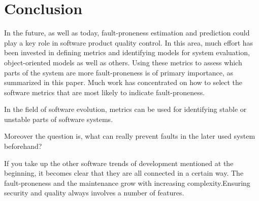 \section{Conclusion}\label{conclusion}

In the future, as well as today, fault-proneness estimation and prediction could play a key role in software product quality control.  In this area, much effort has been invested in defining metrics and identifying models for system evaluation, object-oriented models as well as others.  Using these metrics to assess which parts of the system are more fault-proneness is of primary importance, as summarized in this paper.
Much work has concentrated on how to select the software metrics that are most likely to indicate fault-proneness. 

In the field of software evolution, metrics can be used for identifying stable or unstable parts of software systems.

Moreover the question is, what can really prevent faults in the later used system beforehand?

If you take up the other software trends of development mentioned at the beginning, it becomes clear that they are all connected in a certain way. The fault-proneness and the maintenance grow with increasing complexity.Ensuring security and quality always involves a number of features.







